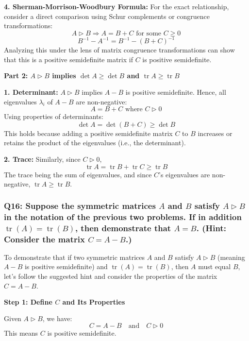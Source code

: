 \documentclass[8pt]{article}
\begin{document}
\textbf{4. Sherman-Morrison-Woodbury Formula:}
   For the exact relationship, consider a direct comparison using Schur complements or congruence transformations:
   \[
   A \triangleright B \Rightarrow A = B + C \text{ for some } C \geq 0
   \]
   \[
   B^{-1} - A^{-1} = B^{-1} - (B + C)^{-1}
   \]
   Analyzing this under the lens of matrix congruence transformations can show that this is a positive semidefinite matrix if \(C\) is positive semidefinite.

\textbf{Part 2: \(A \triangleright B\) implies \(\det A \geq \det B\) and \(\operatorname{tr} A \geq \operatorname{tr} B\)}

\textbf{1. Determinant:}
   \(A \triangleright B\) implies \(A - B\) is positive semidefinite. Hence, all eigenvalues \(\lambda_i\) of \(A - B\) are non-negative:
   \[
   A = B + C \text{ where } C \triangleright 0
   \]
   Using properties of determinants:
   \[
   \det A = \det (B + C) \geq \det B
   \]
   This holds because adding a positive semidefinite matrix \(C\) to \(B\) increases or retains the product of the eigenvalues (i.e., the determinant).

\textbf{2. Trace:}
   Similarly, since \(C \triangleright 0\),
   \[
   \operatorname{tr} A = \operatorname{tr} B + \operatorname{tr} C \geq \operatorname{tr} B
   \]
   The trace being the sum of eigenvalues, and since \(C\)'s eigenvalues are non-negative, \(\operatorname{tr} A \geq \operatorname{tr} B\).


\subsubsection*{Q16: Suppose the symmetric matrices \(A\) and \(B\) satisfy \(A \triangleright B\) in the notation of the previous two problems. If in addition \(\operatorname{tr} (A) = \operatorname{tr} (B)\), then demonstrate that \(A = B\). (Hint: Consider the matrix \(C = A - B\).)}

To demonstrate that if two symmetric matrices \(A\) and \(B\) satisfy \(A \triangleright B\) (meaning \(A - B\) is positive semidefinite) and \(\operatorname{tr}(A) = \operatorname{tr}(B)\), then \(A\) must equal \(B\), let's follow the suggested hint and consider the properties of the matrix \(C = A - B\).

\textbf{Step 1: Define \(C\) and Its Properties}

Given \(A \triangleright B\), we have:
\[
C = A - B \quad \text{and} \quad C \triangleright 0
\]
This means \(C\) is positive semidefinite.
\end{document}
